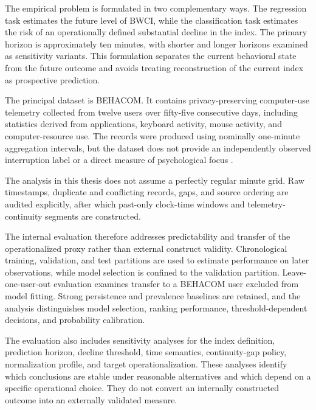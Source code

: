 The empirical problem is formulated in two complementary ways. The regression task estimates the future level of BWCI, while the classification task estimates the risk of an operationally defined substantial decline in the index. The primary horizon is approximately ten minutes, with shorter and longer horizons examined as sensitivity variants. This formulation separates the current behavioral state from the future outcome and avoids treating reconstruction of the current index as prospective prediction.

The principal dataset is BEHACOM. It contains privacy-preserving computer-use telemetry collected from twelve users over fifty-five consecutive days, including statistics derived from applications, keyboard activity, mouse activity, and computer-resource use. The records were produced using nominally one-minute aggregation intervals, but the dataset does not provide an independently observed interruption label or a direct measure of psychological focus \parencite{sanchez2020behacom}.

The analysis in this thesis does not assume a perfectly regular minute grid. Raw timestamps, duplicate and conflicting records, gaps, and source ordering are audited explicitly, after which past-only clock-time windows and telemetry-continuity segments are constructed.

The internal evaluation therefore addresses predictability and transfer of the operationalized proxy rather than external construct validity. Chronological training, validation, and test partitions are used to estimate performance on later observations, while model selection is confined to the validation partition. Leave-one-user-out evaluation examines transfer to a BEHACOM user excluded from model fitting. Strong persistence and prevalence baselines are retained, and the analysis distinguishes model selection, ranking performance, threshold-dependent decisions, and probability calibration.

The evaluation also includes sensitivity analyses for the index definition, prediction horizon, decline threshold, time semantics, continuity-gap policy, normalization profile, and target operationalization. These analyses identify which conclusions are stable under reasonable alternatives and which depend on a specific operational choice. They do not convert an internally constructed outcome into an externally validated measure.


